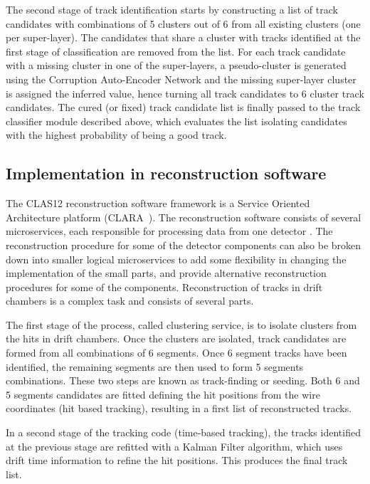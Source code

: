 The second stage of track identification starts by constructing a list of track candidates with combinations 
of 5 clusters out of 6 from all existing clusters (one per super-layer). The candidates that share a cluster with 
tracks identified at the first stage of classification are removed from the list. For each track candidate with a 
missing cluster in one of the super-layers, a pseudo-cluster is generated using the Corruption Auto-Encoder 
Network and the missing super-layer cluster is assigned the inferred value, hence turning all track candidates 
to 6 cluster track candidates. The cured (or fixed) track candidate list is finally passed to the track classifier 
module described above, which evaluates the list isolating candidates with the highest probability of being a 
good track. 

\subsection{Implementation in reconstruction software}

The CLAS12 reconstruction software framework is a Service Oriented Architecture platform (CLARA~\cite{Gyurjyan:2011zz}).
The reconstruction software consists of several microservices, each responsible for processing data from one
detector \cite{Ziegler:2020gsr}. The reconstruction procedure for some of the detector components can also 
be broken down into smaller logical microservices to add some flexibility in changing the implementation of 
the small parts, and provide alternative reconstruction procedures for some of the components. Reconstruction 
of tracks in drift chambers is a complex task and consists of several parts.

The first stage of the process, called clustering service, is to isolate clusters from the hits in drift chambers. 
Once the clusters are isolated, track candidates are formed from all combinations of 6 segments. Once 6 
segment tracks have been identified, the remaining segments are then used to form 5 segments combinations. 
These two steps are known as track-finding or seeding. Both 6 and 5 segments candidates are fitted defining 
the hit positions from the wire coordinates (hit based tracking), resulting in a first list of reconstructed tracks.

In a second stage of the tracking code (time-based tracking), the tracks identified at the previous stage are 
refitted with a Kalman Filter algorithm, which uses drift time information to refine the hit positions. This 
produces the final track list.

